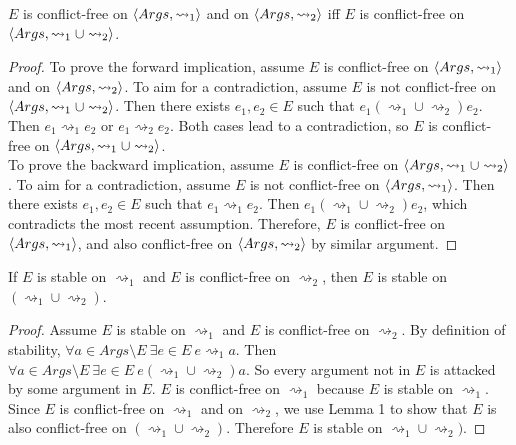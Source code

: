 \begin{lemma}
	$E$ is conflict-free on $\langle{Args},{\rightsquigarrow_1}\rangle$ and on $\langle{Args},{\rightsquigarrow_2}\rangle$ iff $E$ is conflict-free on $\langle{Args},{\rightsquigarrow_1\cup\rightsquigarrow_2}\rangle$.	

	\begin{proof}
		To prove the forward implication, assume $E$ is conflict-free on $\langle{Args},{\rightsquigarrow_1}\rangle$ and on $\langle{Args},{\rightsquigarrow_2}\rangle$. To aim for a contradiction, assume $E$ is not conflict-free on $\langle{Args},{\rightsquigarrow_1\cup\rightsquigarrow_2}\rangle$. Then there exists $e_1,e_2\in E$ such that $e_1(\rightsquigarrow_1\cup\rightsquigarrow_2)e_2$. Then $e_1\rightsquigarrow_1 e_2$ or $e_1\rightsquigarrow_2 e_2$. Both cases lead to a contradiction, so $E$ is conflict-free on $\langle{Args},{\rightsquigarrow_1\cup\rightsquigarrow_2}\rangle$.
		\\
		To prove the backward implication, assume $E$ is conflict-free on $\langle{Args},{\rightsquigarrow_1\cup\rightsquigarrow_2}\rangle$. To aim for a contradiction, assume $E$ is not conflict-free on $\langle{Args},{\rightsquigarrow_1}\rangle$. Then there exists $e_1,e_2\in E$ such that $e_1\rightsquigarrow_1 e_2$. Then $e_1(\rightsquigarrow_1\cup\rightsquigarrow_2)e_2$, which contradicts the most recent assumption. Therefore, $E$ is conflict-free on $\langle{Args},{\rightsquigarrow_1}\rangle$, and also conflict-free on $\langle{Args},{\rightsquigarrow_2}\rangle$ by similar argument.
	\end{proof}
\end{lemma}

\begin{lemma}
	If $E$ is stable on $\rightsquigarrow_1$ and $E$ is conflict-free on $\rightsquigarrow_2$, then $E$ is stable on $(\rightsquigarrow_1\cup\rightsquigarrow_2)$.
	
	\begin{proof}
		Assume $E$ is stable on $\rightsquigarrow_1$ and $E$ is conflict-free on $\rightsquigarrow_2$. By definition of stability, $\forall a\in Args\setminus E\ \exists e\in E\ e\rightsquigarrow_1 a$. Then $\forall a\in Args\setminus E\ \exists e\in E\ e(\rightsquigarrow_1\cup\rightsquigarrow_2)a$. So every argument not in $E$ is attacked by some argument in $E$. $E$ is conflict-free on $\rightsquigarrow_1$ because $E$ is stable on $\rightsquigarrow_1$. Since $E$ is conflict-free on $\rightsquigarrow_1$ and on $\rightsquigarrow_2$, we use Lemma 1 to show that $E$ is also conflict-free on $(\rightsquigarrow_1\cup\rightsquigarrow_2)$. Therefore $E$ is stable on $\rightsquigarrow_1\cup\rightsquigarrow_2)$.
	\end{proof}
\end{lemma}

